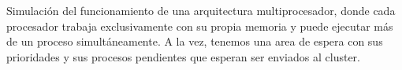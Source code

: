 Simulación del funcionamiento de una arquitectura multiprocesador, donde cada procesador trabaja exclusivamente con su propia memoria y puede ejecutar más de un proceso simultáneamente. A la vez, tenemos una area de espera con sus prioridades y sus procesos pendientes que esperan ser enviados al cluster. 